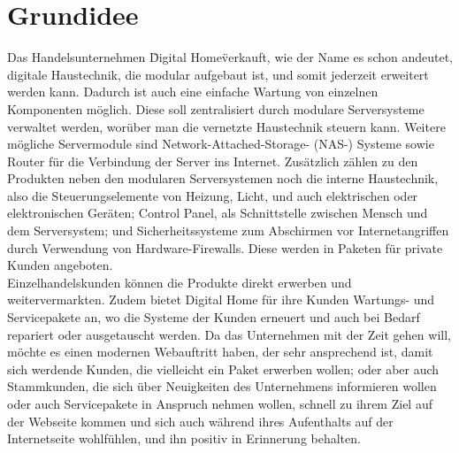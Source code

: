 \section{Grundidee}

Das Handelsunternehmen \"Digital Home\" verkauft, wie der Name es schon andeutet, digitale Haustechnik, die modular aufgebaut ist, und somit jederzeit erweitert werden kann. Dadurch ist auch eine einfache Wartung von einzelnen Komponenten möglich. Diese soll zentralisiert durch modulare Serversysteme verwaltet werden, worüber man die vernetzte Haustechnik steuern kann. Weitere mögliche Servermodule sind Network-Attached-Storage- (NAS-) Systeme sowie Router für die Verbindung der Server ins Internet. Zusätzlich zählen zu den Produkten neben den modularen Serversystemen noch die interne Haustechnik, also die Steuerungselemente von Heizung, Licht, und auch elektrischen oder elektronischen Geräten; Control Panel, als Schnittstelle zwischen Mensch und dem Serversystem; und Sicherheitssysteme zum Abschirmen vor Internetangriffen durch Verwendung von Hardware-Firewalls. Diese werden in Paketen für private Kunden angeboten.  
\\
Einzelhandelskunden können die Produkte direkt erwerben und weitervermarkten. Zudem bietet Digital Home für ihre Kunden Wartungs- und Servicepakete an, wo die Systeme der Kunden erneuert und auch bei Bedarf repariert oder ausgetauscht werden.
\newline
\newline
Da das Unternehmen mit der Zeit gehen will, möchte es einen modernen Webauftritt haben, der sehr ansprechend ist, damit sich werdende Kunden, die vielleicht ein Paket erwerben wollen; oder aber auch Stammkunden, die sich über Neuigkeiten des Unternehmens informieren wollen oder auch Servicepakete in Anspruch nehmen wollen, schnell zu ihrem Ziel auf der Webseite kommen und sich auch während ihres Aufenthalts auf der Internetseite wohlfühlen, und ihn positiv in Erinnerung behalten.
